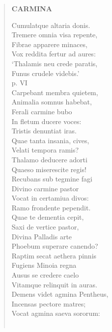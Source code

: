 \documentclass[11pt, a4paper]{report}
\begin{document}
\begin{verse}
     \marginpar{[66]} \begin{center} \textbf{CARMINA} \end{center}Cumulatque altaria donis. \\ Tremere omnia visa repente, \\ Fibrae apparere minaces, \\ Vox reddita fertur ad aures: \\ ‘Thalamis neu crede paratis, \\ Funus crudele videbis.’ \\ p. VI \\ Carpebant membra quietem, \\ Animalia somnus habebat, \\ Ferali carmine bubo \\ In fletum ducere voces: \\ Tristis denuntiat iras. \\ Quae tanta insania, cives, \\ Velati tempora ramis? \\ Thalamo deducere adorti \\ Quaeso miserescite regis! \\ Recubans sub tegmine fagi \\ Divino carmine pastor \\ Vocat in certamiua divos: \\ Ramo frondente pependit. \\ Quae te dementia cepit, \\ Saxi de vertice pastor, \\ Divina Palladis arte \\ Phoebum superare canendo? \\ Raptim secat aethera pinnis \\ Fugiens Minoia regna \\ Ausus se credere caelo \\ Vitamque relinquit in auras. \\ Demens videt agmina Pentheus, \\ Incensas pectore matres; \\ Vocat agmina saeva sororum: \\ 
        ﻿\pagebreak 

\end{verse}
\end{document}
